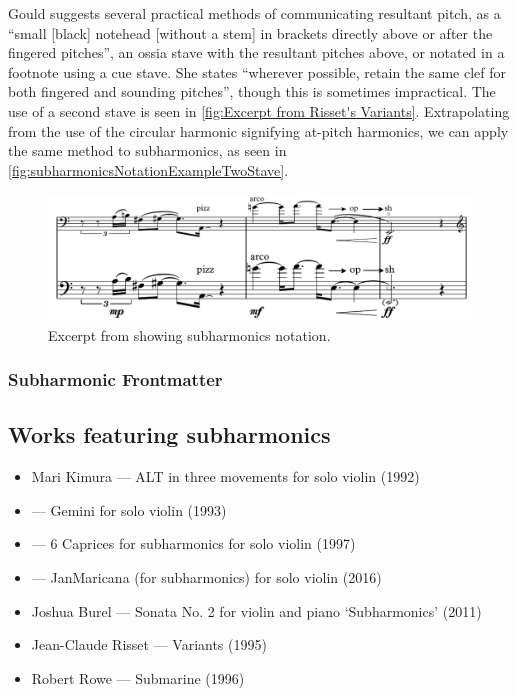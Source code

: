 Gould suggests several practical methods of communicating resultant pitch, as a ``small [black] notehead [without a stem] in brackets directly above or after the fingered pitches'', an ossia stave with the resultant pitches above, or notated in a footnote using a cue stave.\autocite[421]{gouldBars2011}
She states ``wherever possible, retain the same clef for both fingered and sounding pitches'', though this is sometimes impractical.\autocite[422]{gouldBars2011}
The use of a second stave is seen in \autoref{fig:Excerpt from Risset's Variants}.\autocite[It should be noted that Risset's notation omits a fingered pitch, which is not recommended.]{rissetVariants1995}
Extrapolating from the use of the circular harmonic signifying at-pitch harmonics, we can apply the same method to subharmonics, as seen in \autoref{fig:subharmonicsNotationExampleTwoStave}.
\begin{figure}
  \centering
  \includegraphics[width=\linewidth]{./resources/subharmonicsNotationExample.pdf}
  \caption{Excerpt from \bassPiece\space showing subharmonics notation.}\label{fig:subharmonicsNotationExampleTwoStave}
\end{figure}



\subsubsection{Subharmonic Frontmatter}\label{sec:subharmonicFrontmatter}

\subsection{Works featuring subharmonics }\label{sec:subharmonicsLiterature}

\begin{itemize}
    \item Mari Kimura --- ALT in three movements for solo violin (1992)
    \item --- Gemini for solo violin (1993)
    \item --- 6 Caprices for subharmonics for solo violin (1997) 
    \item --- JanMaricana (for subharmonics) for solo violin (2016)
    \item Joshua Burel --- Sonata No. 2 for violin and piano `Subharmonics' (2011)
    \item Jean-Claude Risset --- Variants (1995)
    \item Robert Rowe --- Submarine (1996)
\end{itemize}


